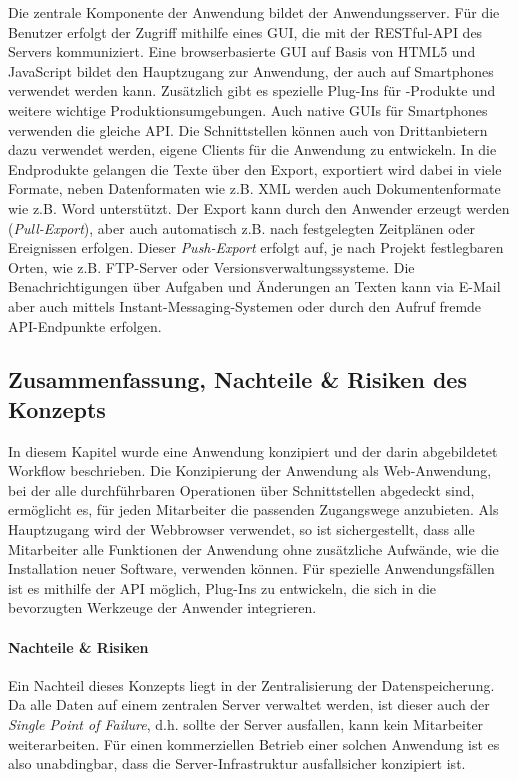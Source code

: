 Die zentrale Komponente der Anwendung bildet der Anwendungsserver. Für die Benutzer erfolgt der Zugriff mithilfe eines GUI, die mit der RESTful-API des Servers kommuniziert. Eine browserbasierte GUI auf Basis von HTML5 und JavaScript bildet den Hauptzugang zur Anwendung, der auch auf Smartphones verwendet werden kann. Zusätzlich gibt es spezielle Plug-Ins für -Produkte und weitere wichtige Produktionsumgebungen. Auch native GUIs für Smartphones verwenden die gleiche API. Die Schnittstellen können auch von Drittanbietern dazu verwendet werden, eigene Clients für die Anwendung zu entwickeln. In die Endprodukte gelangen die Texte über den Export, exportiert wird dabei in viele Formate, neben Datenformaten wie z.B. XML werden auch Dokumentenformate wie z.B. Word unterstützt. Der Export kann durch den Anwender erzeugt werden (\emph{Pull-Export}), aber auch automatisch z.B. nach festgelegten Zeitplänen oder Ereignissen erfolgen. Dieser \emph{Push-Export} erfolgt auf, je nach Projekt festlegbaren Orten, wie z.B. FTP-Server oder Versionsverwaltungssysteme. Die Benachrichtigungen über Aufgaben und Änderungen an Texten kann via E-Mail aber auch mittels Instant-Messaging-Systemen oder durch den Aufruf fremde API-Endpunkte erfolgen.

\pagebreak

\subsection{Zusammenfassung, Nachteile \& Risiken des Konzepts}

In diesem Kapitel wurde eine Anwendung konzipiert und der darin abgebildetet Workflow beschrieben. Die Konzipierung der Anwendung als Web-Anwendung, bei der alle durchführbaren Operationen über Schnittstellen abgedeckt sind, ermöglicht es, für jeden Mitarbeiter die passenden Zugangswege anzubieten. Als Hauptzugang wird der Webbrowser verwendet, so ist sichergestellt, dass alle Mitarbeiter alle Funktionen der Anwendung ohne zusätzliche Aufwände, wie die Installation neuer Software, verwenden können. Für spezielle Anwendungsfällen ist es mithilfe der API möglich, Plug-Ins zu entwickeln, die sich in die bevorzugten Werkzeuge der Anwender integrieren.

\paragraph{Nachteile \& Risiken} Ein Nachteil dieses Konzepts liegt in der Zentralisierung der Datenspeicherung. Da alle Daten auf einem zentralen Server verwaltet werden, ist dieser auch der \emph{Single Point of Failure}, d.h. sollte der Server ausfallen, kann kein Mitarbeiter weiterarbeiten. Für einen kommerziellen Betrieb einer solchen Anwendung ist es also unabdingbar, dass die Server-Infrastruktur ausfallsicher konzipiert ist. 

